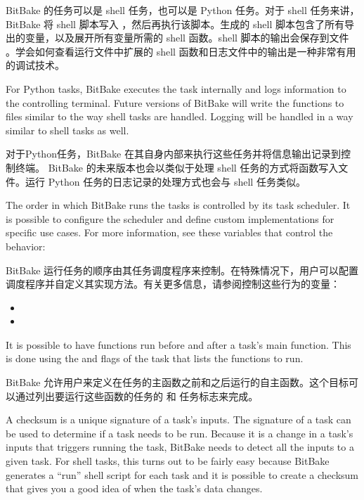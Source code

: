 BitBake 的任务可以是 shell 任务，也可以是 Python 任务。对于 shell 任务来讲，BitBake 将 shell 脚本写入 \footnotemark[1]，然后再执行该脚本。生成的 shell 脚本包含了所有导出的变量，以及展开所有变量所需的 shell 函数。shell 脚本的输出会保存到文件 \footnotemark[1]。学会如何查看运行文件中扩展的 shell 函数和日志文件中的输出是一种非常有用的调试技术。


For Python tasks, BitBake executes the task internally and logs information to the controlling terminal. Future versions of BitBake will write the functions to files similar to the way shell tasks are handled. Logging will be handled in a way similar to shell tasks as well.

对于Python任务，BitBake 在其自身内部来执行这些任务并将信息输出记录到控制终端。 BitBake 的未来版本也会以类似于处理 shell 任务的方式将函数写入文件。运行 Python 任务的日志记录的处理方式也会与 shell 任务类似。

The order in which BitBake runs the tasks is controlled by its task scheduler. It is possible to configure the scheduler and define custom implementations for specific use cases. For more information, see these variables that control the behavior:

BitBake 运行任务的顺序由其任务调度程序来控制。在特殊情况下，用户可以配置调度程序并自定义其实现方法。有关更多信息，请参阅控制这些行为的变量：

\begin{itemize}
\setlength\itemsep{1.0em}
\item {}
\item {}
\end{itemize}

It is possible to have functions run before and after a task's main function. This is done using the \code{[prefuncs]} and \code{[postfuncs]} flags of the task that lists the functions to run.

BitBake 允许用户来定义在任务的主函数之前和之后运行的自主函数。这个目标可以通过列出要运行这些函数的任务的 \code{[prefuncs]} 和 \code{[postfuncs]} 任务标志来完成。

\label{section:Checksums (Signatures)}

A checksum is a unique signature of a task's inputs. The signature of a task can be used to determine if a task needs to be run. Because it is a change in a task's inputs that triggers running the task, BitBake needs to detect all the inputs to a given task. For shell tasks, this turns out to be fairly easy because BitBake generates a ``run'' shell script for each task and it is possible to create a checksum that gives you a good idea of when the task's data changes.

